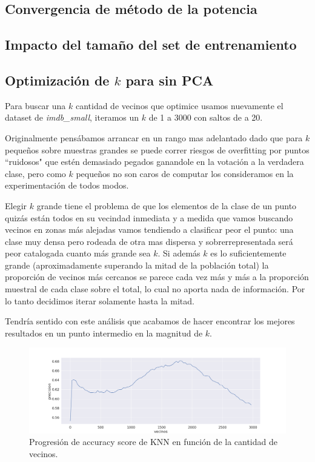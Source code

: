 \subsection{Convergencia de método de la potencia}%
\label{sub:pm}


\subsection{Impacto del tamaño del set de entrenamiento}%
\label{sub:exp_training_set}


\subsection{Optimización de $k$ para \knn{} sin PCA}%
\label{sub:knn_sin_pca}

Para buscar una $k$ cantidad de vecinos que optimice \knn{} usamos nuevamente el dataset de \textit{imdb\_small}, iteramos un $k$ de 1 a 3000 con saltos de a 20.

Originalmente pensábamos arrancar en un rango mas adelantado dado que para $k$ pequeños sobre muestras grandes se puede correr riesgos de overfitting por puntos ``ruidosos" que estén demasiado pegados ganandole en la votación a la verdadera clase, pero como $k$ pequeños no son caros de computar los consideramos en la experimentación de todos modos.

Elegir $k$ grande tiene el problema de que los elementos de la clase de un punto quizás están todos en su vecindad inmediata y a medida que vamos buscando vecinos en zonas más alejadas vamos tendiendo a clasificar peor el punto: una clase muy densa pero rodeada de otra mas dispersa y sobrerrepresentada será peor catalogada cuanto más grande sea $k$. Si además $k$ es lo suficientemente grande (aproximadamente superando la mitad de la población total) la proporción de vecinos más cercanos se parece cada vez más y más a la proporción muestral de cada clase sobre el total, lo cual no aporta nada de información. Por lo tanto decidimos iterar solamente hasta la mitad.

Tendría sentido con este análisis que acabamos de hacer encontrar los mejores resultados en un punto intermedio en la magnitud de $k$.

\begin{figure}[h]
\includegraphics[width=\textwidth]{./img/knn.png}
\centering
\caption{Progresión de accuracy score de KNN en función de la cantidad de vecinos.\label{fig:knn_acc}}

\end{figure}

